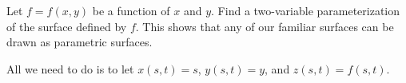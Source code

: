 \begin{activity} \label{A:11.6.2} Let $f = f(x,y)$ be a function of $x$ and $y$. Find a two-variable parameterization of the surface defined by $f$. This shows that any of our familiar surfaces can be drawn as parametric surfaces.

\end{activity}
\begin{smallhint}

\end{smallhint}
\begin{bighint}

\end{bighint}
\begin{activitySolution}

All we need to do is to let $x(s,t) = s$, $y(s,t) = y$, and $z(s,t) = f(s,t)$.


\end{activitySolution}
\aftera

